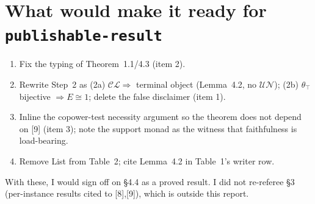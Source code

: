 \documentclass[11pt]{article}
\newcommand{\CL}{\mathcal{CL}}
\newcommand{\UN}{\mathcal{UN}}
\begin{document}
\section*{What would make it ready for \texttt{publishable-result}}
\begin{enumerate}[leftmargin=*]
\item Fix the typing of Theorem~1.1/4.3 (item 2).
\item Rewrite Step~2 as (2a) $\CL\Rightarrow$ terminal object (Lemma~4.2, no $\UN$);
  (2b) $\theta_\top$ bijective $\Rightarrow E\cong1$; delete the false disclaimer (item 1).
\item Inline the copower-test necessity argument so the theorem does not depend on
  [9] (item 3); note the support monad as the witness that faithfulness is load-bearing.
\item Remove List from Table~2; cite Lemma~4.2 in Table~1's writer row.
\end{enumerate}
With these, I would sign off on \S4.4 as a proved result. I did not re-referee
\S3 (per-instance results cited to [8],[9]), which is outside this report.
\end{document}
